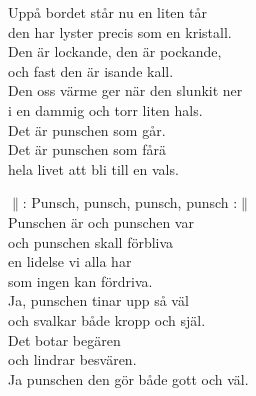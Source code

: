 \documentclass[a6paper,10pt]{article}
\begin{document}
\setlength{\oddsidemargin}{-0.37in}
\noindent
\begin{center}
\end{center}
Uppå bordet står nu en liten tår\\
den har lyster precis som en kristall.\\
Den är lockande, den är pockande,\\
och fast den är isande kall.\\
Den oss värme ger när den slunkit ner\\
i en dammig och torr liten hals.\\
Det är punschen som går.\\
Det är punschen som fårä\\
hela livet att bli till en vals.
\vspace{40pt}
\begin{center}
\end{center}
$\|$: Punsch, punsch, punsch, punsch :$\|$
\vspace{5pt}\\
Punschen är och punschen var\\
och punschen skall förbliva\\
en lidelse vi alla har\\
som ingen kan fördriva.
\vspace{5pt}\\
Ja, punschen tinar upp så väl\\
och svalkar både kropp och själ.\\
Det botar begären\\
och lindrar besvären.\\
Ja punschen den gör både gott och väl.
\end{document}
